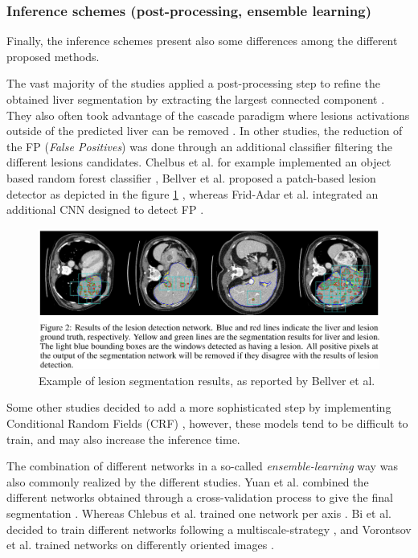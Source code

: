 \documentclass[]{article}
\begin{document}
\subsubsection*{Inference schemes (post-processing, ensemble learning)}


Finally, the inference schemes present also some differences among the
different proposed methods.

The vast majority of the studies applied a post-processing step to
refine the obtained liver segmentation by extracting the largest
connected component \cite{Li2018, Han2017, Yuan2017, Bellver2017, Kaluva2018}. They
also often took advantage of the cascade paradigm where lesions
activations outside of the predicted liver can be removed \cite{Li2018, Yuan2017, Vorontsov2018}. In other studies, the reduction of the FP
(\emph{False Positives}) was done through an additional classifier
filtering the different lesions candidates. Chelbus et al. for
example implemented an object based random forest classifier \cite{Chlebus2018},
Bellver et al. proposed a patch-based lesion detector as
depicted in the figure \ref{Bellver_predResults} \cite{Bellver2017}, whereas Frid-Adar et al. integrated an
additional CNN designed to detect FP \cite{Frid-adar2017}.

\begin{figure}[th!]
	\centering
	\includegraphics[width=0.7\linewidth]{images/image25}
	\caption{Example of lesion segmentation results, as reported by Bellver et al. \cite{Bellver2017}}
	\label{Bellver_predResults}
\end{figure}


Some other studies decided to add a more sophisticated step by
implementing Conditional Random Fields (CRF) \cite{Christ2017, Rafiei2018, Dou2016}, however, these models
tend to be difficult to train, and may also
increase the inference time.

The combination of different networks in a so-called
\emph{ensemble-learning} way was also commonly realized by the different
studies. Yuan et al. combined the different networks obtained
through a cross-validation process to give the final segmentation \cite{Yuan2017}.
Whereas Chlebus et al. trained one network per axis \cite{Chlebus2018}. Bi et al. decided to train different networks following a
multiscale-strategy \cite{Bi2017}, and Vorontsov et al. trained networks on
differently oriented images \cite{Vorontsov2018}.
\end{document}
